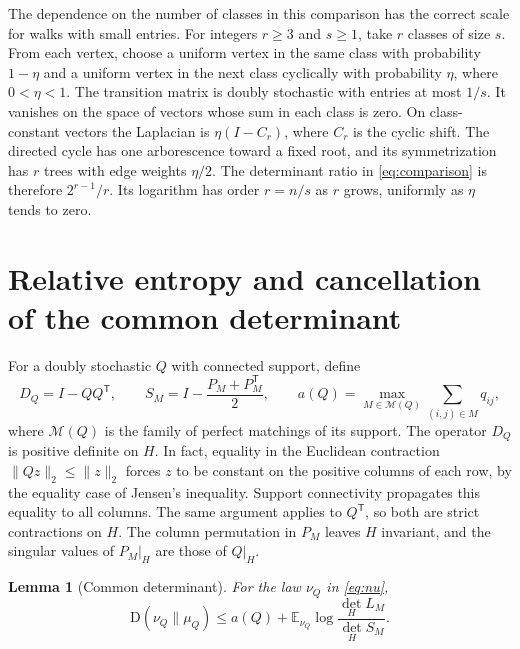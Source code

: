 \documentclass[11pt]{article}
\newcommand{\E}{\mathbb{E}}
\newcommand{\KL}{\mathrm{D}}
\newcommand{\trans}{\mathsf{T}}
\newcommand{\cM}{\mathcal{M}}
\newtheorem{lemma}[theorem]{Lemma}
\begin{document}
The dependence on the number of classes in this comparison has the correct scale for walks with small entries. For integers \(r\ge3\) and \(s\ge1\), take \(r\) classes of size \(s\). From each vertex, choose a uniform vertex in the same class with probability \(1-\eta\) and a uniform vertex in the next class cyclically with probability \(\eta\), where \(0<\eta<1\). The transition matrix is doubly stochastic with entries at most \(1/s\). It vanishes on the space of vectors whose sum in each class is zero. On class-constant vectors the Laplacian is \(\eta(I-C_r)\), where \(C_r\) is the cyclic shift. The directed cycle has one arborescence toward a fixed root, and its symmetrization has \(r\) trees with edge weights \(\eta/2\). The determinant ratio in \eqref{eq:comparison} is therefore \(2^{r-1}/r\). Its logarithm has order \(r=n/s\) as \(r\) grows, uniformly as \(\eta\) tends to zero.

\section{Relative entropy and cancellation of the common determinant}\label{sec:entropy}

For a doubly stochastic \(Q\) with connected support, define
\[
 D_Q=I-QQ^{\trans},\qquad S_M=I-\frac{P_M+P_M^{\trans}}2,\qquad
 a(Q)=\max_{M\in\cM(Q)}\sum_{(i,j)\in M}q_{ij},
\]
where \(\cM(Q)\) is the family of perfect matchings of its support. The operator \(D_Q\) is positive definite on \(H\). In fact, equality in the Euclidean contraction \(\|Qz\|_2\le\|z\|_2\) forces \(z\) to be constant on the positive columns of each row, by the equality case of Jensen's inequality. Support connectivity propagates this equality to all columns. The same argument applies to \(Q^{\trans}\), so both are strict contractions on \(H\). The column permutation in \(P_M\) leaves \(H\) invariant, and the singular values of \(P_M|_H\) are those of \(Q|_H\).

\begin{lemma}[Common determinant]\label{lem:entropy}
For the law \(\nu_Q\) in \eqref{eq:nu},
\begin{equation}\label{eq:relative}
 \KL(\nu_Q\|\mu_Q)
 \le a(Q)+\E_{\nu_Q}\log\frac{\det_H L_M}{\det_H S_M}.
\end{equation}
\end{lemma}
\end{document}
